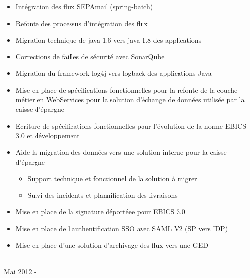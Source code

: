 \documentclass[letterpaper]{twentysecondcv} %
\begin{document}
\begin{twenty}
{\begin{itemize}
{\begin{itemize}
	\end{itemize}}
	\item Intégration des flux  SEPAmail (spring-batch)
	 \item Refonte des processus d'intégration des flux
	 \item Migration technique de java 1.6 vers java 1.8 des applications
	 \item Corrections de failles de sécurité avec SonarQube
	 \item Migration du framework log4j vers logback des applications Java
	\item Mise en place de spécifications fonctionnelles pour la refonte de la couche métier en WebServices pour la solution d'échange de données utilisée par la caisse d’épargne
	\item Ecriture de spécifications fonctionnelles pour l’évolution de la norme EBICS 3.0 et développement
	\item Aide la migration des données vers une solution interne pour la caisse d'épargne
        {\begin{itemize}
                \item Support technique et fonctionnel de la solution à migrer
                \item Suivi des incidents et plannification des livraisons
	\end{itemize}}
        \item Mise en place de la signature déportéee pour EBICS 3.0
        \item Mise en place de l'authentification SSO avec SAML V2 (SP vers IDP)
        \item Mise en place d'une solution d'archivage des flux vers une GED
        \end{itemize}}
        \\
	\twentyitem
    	{Mai 2012 -}

\end{twenty}
\end{document}

